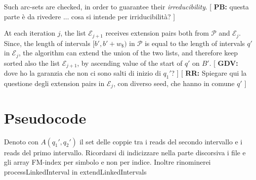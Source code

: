 \documentclass[runningheads,envcountsame,a4paper]{llncs}
\newcommand{\notaestesa}[2]{%
 \marginpar{\color{red!75!black}\textbf{\texttimes}}%
 {\color{red!75!black}%
 [\,\textbullet\,\textsf{\textbf{#1:}} %
 \textsf{\footnotesize#2}\,\textbullet\,]}%
}
\begin{document}
Such arc-sets are checked, in order to guarantee their
\emph{irreducibility}.
\notaestesa{PB}{questa parte è da rivedere ... cosa si intende per
  irriducibilità?}

At each iteration $j$, the list $\mathcal{E}_{j+1}$ receives extension
pairs both from $\mathcal{P}$ and $\mathcal{E}_{j}$.
Since, the length of intervals $[b', b'+w_\$)$ in $\mathcal{P}$ is
equal to the length of intervals $q'$ in $\mathcal{E}_{j}$, the
algorithm can extend the union of the two lists, and therefore keep
sorted also the list $\mathcal{E}_{j+1}$, by ascending value of the
start of $q'$ on $B'$.\notaestesa{GDV}{ dove ho la
  garanzia che non ci sono salti di inizio di $q_{1}'$?} \notaestesa{RR}{Spiegare qui la questione degli extension pairs in $\mathcal{E}_j$, con diverso seed, che hanno in comune $q'$}








\section*{Pseudocode}
Denoto con $A(q_{1}', q_{2}')$ il set delle coppie tra i reads del secondo intervallo e i reads del primo intervallo.
Ricordarsi di indicizzare nella parte discorsiva i file e gli array FM-index per simbolo e non per indice.
Inoltre rinominerei processLinkedInterval in extendLinkedIntervals
\end{document}
